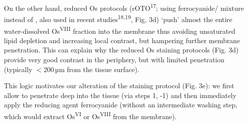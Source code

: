 \documentclass{article}
\begin{document}
On the other hand, reduced Os protocols (rOTO\textsuperscript{17}; using ferrocyanide/ mixture instead of , also used in recent studies\textsuperscript{18,19}, Fig. 3d) `push' almost the entire water-dissolved Os\textsuperscript{VIII} fraction into the membrane thus avoiding unsaturated lipid depletion and increasing local contrast, but hampering further membrane penetration. This can explain why the reduced Os staining protocols (Fig. 3d) provide very good contrast in the periphery, but with limited penetration (typically $<$200\,µm from the tissue surface).

This logic motivates our alteration of the staining protocol (Fig. 3e): we first allow  to penetrate deep into the tissue (via steps 1, -1) and then immediately apply the reducing agent ferrocyanide (without an intermediate washing step, which would extract Os\textsuperscript{VI} or Os\textsuperscript{VIII} from the membrane).
\end{document}
